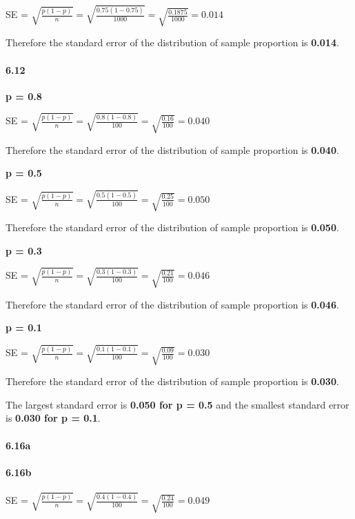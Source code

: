\documentclass[
]{article}
\begin{document}
SE =
\(\sqrt{\frac{p(1-p)}{n}}=\sqrt{\frac{0.75(1-0.75)}{1000}}= \sqrt{\frac{0.1875}{1000}} = 0.014\)

Therefore the standard error of the distribution of sample proportion is
\textbf{0.014}.

\hypertarget{section-12}{%
\paragraph{6.12}\label{section-12}}

\textbf{p = 0.8}

SE =
\(\sqrt{\frac{p(1-p)}{n}}=\sqrt{\frac{0.8(1-0.8)}{100}}= \sqrt{\frac{0.16}{100}} = 0.040\)

Therefore the standard error of the distribution of sample proportion is
\textbf{0.040}.

\textbf{p = 0.5}

SE =
\(\sqrt{\frac{p(1-p)}{n}}=\sqrt{\frac{0.5(1-0.5)}{100}}= \sqrt{\frac{0.25}{100}} = 0.050\)

Therefore the standard error of the distribution of sample proportion is
\textbf{0.050}.

\textbf{p = 0.3}

SE =
\(\sqrt{\frac{p(1-p)}{n}}=\sqrt{\frac{0.3(1-0.3)}{100}}= \sqrt{\frac{0.21}{100}} = 0.046\)

Therefore the standard error of the distribution of sample proportion is
\textbf{0.046}.

\textbf{p = 0.1}

SE =
\(\sqrt{\frac{p(1-p)}{n}}=\sqrt{\frac{0.1(1-0.1)}{100}}= \sqrt{\frac{0.09}{100}} = 0.030\)

Therefore the standard error of the distribution of sample proportion is
\textbf{0.030}.

The largest standard error is \textbf{0.050 for p = 0.5} and the
smallest standard error is \textbf{0.030 for p = 0.1}.

\hypertarget{a-17}{%
\paragraph{6.16a}\label{a-17}}

\hypertarget{b-17}{%
\paragraph{6.16b}\label{b-17}}

SE =
\(\sqrt{\frac{p(1-p)}{n}}=\sqrt{\frac{0.4(1-0.4)}{100}}= \sqrt{\frac{0.24}{100}} = 0.049\)
\end{document}
